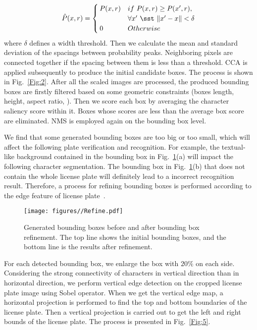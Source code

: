 \documentclass[twocolumn]{svjour3}
\begin{document}
\begin{equation}
\hat{P}(x,r) =
\begin{cases}
P(x,r) & if \,\, P(x,r) \ge P(x',r), \\
       & \forall x' \,\, \sst \,\, \|x' - x\| < \delta \\
0 & Otherwise
\end{cases}
\end{equation}
where $\delta$ defines a width threshold.
Then we calculate the mean and standard deviation of the spacings between probability peaks. Neighboring pixels are connected together if the spacing between them is less than a threshold. CCA is applied subsequently to produce the initial candidate boxes. The process is shown in Fig.~\ref{Fig:2}. %
After all the scaled images are processed, the produced bounding boxes are firstly filtered based on some geometric constraints (boxes length, height, aspect ratio, \etc). Then we score each box by averaging the character saliency score within it. Boxes whose scores are less than the average box score are eliminated. NMS is employed again on the bounding box level.

We find that some generated bounding boxes are too big or too small, which will affect the following plate verification and recognition. For example, the textual-like background contained in the bounding box in Fig.~\ref{Fig:41}(a) will impact the following character segmentation. The bounding box in Fig.~\ref{Fig:41}(b) that does not contain the whole license plate will definitely lead to a incorrect recognition result. Therefore, a process for refining bounding boxes is performed according to the edge feature of license plate~\cite{Zheng2013An}.

\begin{figure}[tb]
\centering
\texttt{[image: figures//Refine.pdf]}
\caption{Generated bounding boxes before and after bounding box refinement. The top line shows the initial bounding boxes, and the bottom line is the results after refinement. }
\label{Fig:41}
\end{figure}For each detected bounding box, we enlarge the box with $20\%$ on each side. Considering the strong connectivity of characters in vertical direction than in horizontal direction, we perform vertical edge detection on the cropped license plate image using Sobel operator. When we get the vertical edge map, a horizontal projection is performed to find the top and bottom boundaries of the license plate. Then a vertical projection is carried out to get the left and right bounds of the license plate. The process is presented in Fig.~\ref{Fig:5}.
\end{document}
